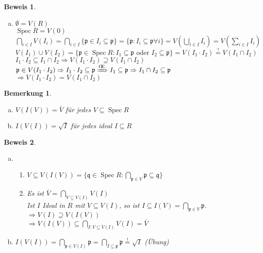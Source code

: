 \documentclass[a4paper, 12pt, numbers=noendperiod, chapterprefix=true]{scrbook}
\theoremstyle{break}
\newtheorem{Bem}[Def]{Bemerkung}
\theoremstyle{nonumberbreak}
\newtheorem{bew}{Beweis}
\theoremstyle{nonumberplain}
\newcommand{\quot}[1]{\textrm{\glqq}{#1}\textrm{\grqq}}
\newenvironment{twosidedproof}{\begin{enumerate}[\quot{$\Rightarrow$}:]}{\end{enumerate}}
\newcommand{\proofsubseteq}{\item[\quot{$\subseteq$}:]}
\newcommand{\proofsupseteq}{\item[\quot{$\supseteq$}:]}
\DeclareMathOperator{\Spec}{Spec}
\newcommand{\p}{\mathfrak{p}} %
\newcommand{\q}{\mathfrak{q}} %
\renewcommand{\OE}{O\!\!E~}
\begin{document}
\begin{bew}\begin{enumerate}[a)]\item[c)]
$\emptyset = V(R)$\\
$\Spec R = V(0)$\\
$\bigcap\limits_{i\in I} V(I_i) = \bigcap\limits_{i\in I}\{\p \in I_i \subseteq \p\} = \{\p: I_i \subseteq \p \forall i\} = V(\bigcup\limits_{i\in I} I_i) = V(\sum\limits_{i\in I} I_i)$\\
$V(I_1)\cup V(I_2) = \{\p \in \Spec R: I_1 \subseteq \p \text{ oder } I_2 \subseteq \p\} = V(I_1\cdot I_2) \overset{?}{=} V(I_1\cap I_2)$\\
\hspace*{10mm} $I_1\cdot I_2 \subseteq I_1 \cap I_2 \Rightarrow V(I_1\cdot I_2) \supseteq V(I_1\cap I_2)$\\
\hspace*{10mm} $\p \in V(I_1\cdot I_2) \Rightarrow I_1\cdot I_2 \subseteq \p \xRightarrow{\text{\OE}} I_1 \subseteq \p \Rightarrow I_1\cap I_2 \subseteq \p$\\
$\Rightarrow V(I_1\cdot I_2) = V(I_1\cap I_2)$
\end{enumerate}\end{bew}

\begin{Bem}\begin{enumerate}[a)]
\item
  $V(I(V)) = \bar{V}$ f\"ur jedes $V\subseteq \Spec R$
\item
  $I(V(I)) = \sqrt{I}$ f\"ur jedes ideal $I\subseteq R$
\end{enumerate}\end{Bem}

\begin{bew}\begin{enumerate}[a)]
\item
  \begin{twosidedproof}
  \proofsupseteq
    $V\subseteq V(I(V)) = \{\q \in \Spec R: \bigcap\limits_{\p \in V} \p \subseteq \q \}$
  \proofsubseteq
    Es ist $\bar{V} = \bigcap\limits_{V\subseteq V(I)}V(I)$\\
    Ist $I$ Ideal in $R$ mit $V\subseteq V(I)$, so ist $I\subseteq I(V) = \bigcap\limits_{\p \in V} \p$.\\
    $\Rightarrow V(I) \supseteq V(I(V))$\\
    $\Rightarrow V(I(V)) \subseteq \bigcap\limits_{I:V\subseteq V(I)} V(I) = \bar{V}$
  \end{twosidedproof}
\item
  $I(V(I)) = \bigcap\limits_{\p \in V(I)} \p = \bigcap\limits_{I\subseteq \p} \p \overset{!}{=} \sqrt{I}$ (\"Ubung)
\end{enumerate}\end{bew}
\end{document}

